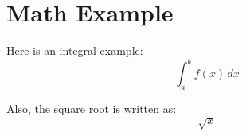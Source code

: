 \documentclass{article}
\begin{document}
\section*{Math Example}
Here is an integral example:
\[
\int_{a}^{b} f(x) \, dx
\]

Also, the square root is written as:
\[
\sqrt{x}
\]
\end{document}
